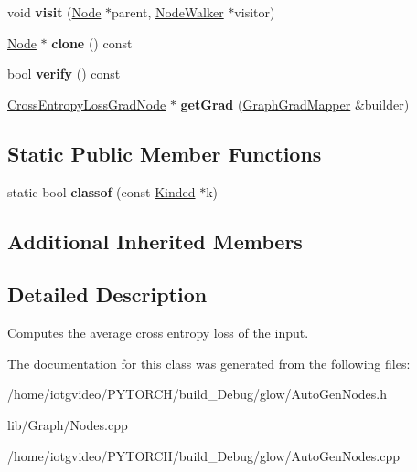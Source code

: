 \begin{DoxyCompactItemize}
void {\bfseries visit} (\hyperlink{classglow_1_1_node}{Node} $\ast$parent, \hyperlink{classglow_1_1_node_walker}{Node\+Walker} $\ast$visitor)
\item 
\mbox{\label{classglow_1_1_cross_entropy_loss_node_a3e1491c569b795283e99bec8650e73e9}} 
\hyperlink{classglow_1_1_node}{Node} $\ast$ {\bfseries clone} () const
\item 
\mbox{\label{classglow_1_1_cross_entropy_loss_node_a3402208238863f95cd1d6af1bd85eb76}} 
bool {\bfseries verify} () const
\item 
\mbox{\label{classglow_1_1_cross_entropy_loss_node_a852eb9d8e721875476e9481b1586844d}} 
\hyperlink{classglow_1_1_cross_entropy_loss_grad_node}{Cross\+Entropy\+Loss\+Grad\+Node} $\ast$ {\bfseries get\+Grad} (\hyperlink{classglow_1_1_graph_grad_mapper}{Graph\+Grad\+Mapper} \&builder)
\end{DoxyCompactItemize}
\subsection*{Static Public Member Functions}
\begin{DoxyCompactItemize}
\item 
\mbox{\label{classglow_1_1_cross_entropy_loss_node_aa5f5094303efa947a6d4661b23e16405}} 
static bool {\bfseries classof} (const \hyperlink{classglow_1_1_kinded}{Kinded} $\ast$k)
\end{DoxyCompactItemize}
\subsection*{Additional Inherited Members}


\subsection{Detailed Description}
Computes the average cross entropy loss of the input. 

The documentation for this class was generated from the following files\+:\begin{DoxyCompactItemize}
\item 
/home/iotgvideo/\+P\+Y\+T\+O\+R\+C\+H/build\+\_\+\+Debug/glow/Auto\+Gen\+Nodes.\+h\item 
lib/\+Graph/Nodes.\+cpp\item 
/home/iotgvideo/\+P\+Y\+T\+O\+R\+C\+H/build\+\_\+\+Debug/glow/Auto\+Gen\+Nodes.\+cpp\end{DoxyCompactItemize}
